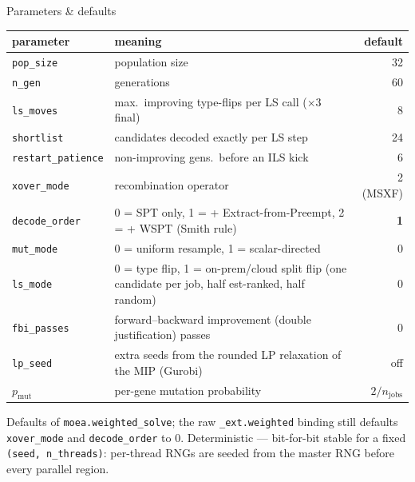 \documentclass[aspectratio=169,t]{beamer}
\newcommand{\code}[1]{\texttt{#1}}
\begin{document}
\begin{frame}{Parameters \& defaults}
  \begin{center}
  \renewcommand{\arraystretch}{0.85}
  \footnotesize
  \begin{tabular}{lp{6.6cm}r}
    \toprule
    \textbf{parameter} & \textbf{meaning} & \textbf{default} \\
    \midrule
    \code{pop\_size}         & population size                                   & 32 \\
    \code{n\_gen}            & generations                                       & 60 \\
    \code{ls\_moves}         & max.\ improving type-flips per LS call ($\times 3$ final) & 8 \\
    \code{shortlist}         & candidates decoded exactly per LS step            & 24 \\
    \code{restart\_patience} & non-improving gens.\ before an ILS kick           & 6 \\
    \code{xover\_mode}       & recombination operator                            & 2 (MSXF) \\
    \code{decode\_order}     & 0 = SPT only, 1 = + Extract-from-Preempt, 2 = + WSPT (Smith rule) & \textbf{1} \\
    \code{mut\_mode}         & 0 = uniform resample, 1 = scalar-directed         & 0 \\
    \code{ls\_mode}          & 0 = type flip, 1 = on-prem/cloud split flip (one candidate per job, half est-ranked, half random) & 0 \\
    \code{fbi\_passes}       & forward--backward improvement (double justification) passes & 0 \\
    \code{lp\_seed}          & extra seeds from the rounded LP relaxation of the MIP (Gurobi) & off \\
    $p_{\text{mut}}$         & per-gene mutation probability                     & $2/n_{\text{jobs}}$ \\
    \bottomrule
  \end{tabular}
  \end{center}
  \vspace{1mm}
  \scriptsize Defaults of \code{moea.weighted\_solve}; the raw \code{\_ext.weighted}
  binding still defaults \code{xover\_mode} and \code{decode\_order} to 0.
  Deterministic --- bit-for-bit stable for a fixed \code{(seed, n\_threads)}:
  per-thread RNGs are seeded from the master RNG before every parallel region.
\end{frame}
\end{document}
